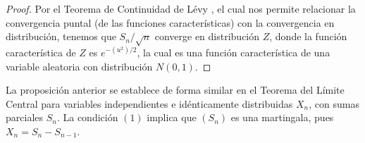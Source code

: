 \begin{proof}
Por el Teorema de Continuidad de Lévy \cite[p.~166]{jacodprotter}, el cual nos permite relacionar la convergencia puntal (de las funciones características) con la convergencia en distribución, tenemos que $S_n/\sqrt{n}$ converge en distribución  $Z$, donde la función característica de $Z$ es $e^{-(u^2)/2}$, la cual es una función característica de una variable aleatoria con distribución $N(0, 1)$.
\end{proof}

La proposición anterior se establece de forma similar en el Teorema del Límite Central \cite[p.~181]{jacodprotter} para variables independientes e idénticamente distribuidas $X_n$, con sumas parciales $S_n$. La condición $(1)$ implica que $(S_n)$ es una martingala, pues $X_n = S_n - S_{n-1}$. 





